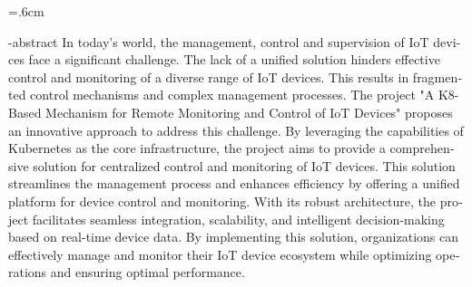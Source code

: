 
\baselineskip=.6cm
\begin{latin}
\en-abstract{
  In today's world, the management, control and supervision of IoT devices 
  face a significant challenge. The lack of a unified solution hinders 
  effective control and monitoring of a diverse range of IoT devices. 
  This results in fragmented control mechanisms and complex management processes. 
  The project 
  "A K8-Based Mechanism for Remote Monitoring and Control of IoT Devices" 
  proposes an innovative approach to address this challenge. 
  By leveraging the capabilities of Kubernetes as the core infrastructure, 
  the project aims to provide a comprehensive solution for centralized control
   and monitoring of IoT devices. This solution streamlines the management 
   process and enhances efficiency by offering a unified platform for device 
   control and monitoring. With its robust architecture, the project facilitates
    seamless integration, scalability, and intelligent decision-making based on
     real-time device data. By implementing this solution, organizations can
      effectively manage and monitor their IoT device ecosystem while optimizing
       operations and ensuring optimal performance.
}
\latinfirstPage
\end{latin}
